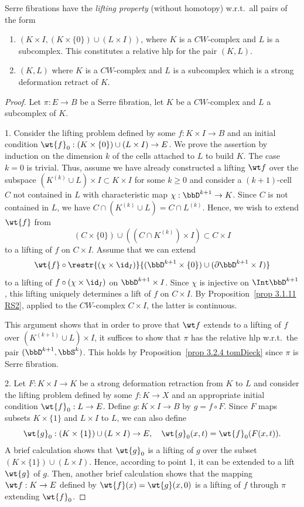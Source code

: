 \begin{prop}[{{\cite[Prop.~3.2.3]{RS2}}}]\label{prop 3.2.3 RS2}
    Serre fibrations have the \textit{lifting property} (without homotopy) w.r.t.\ all pairs of the form
    \begin{enumerate}
        \item $(K\times I,(K\times \{0\})\cup(L\times I))$, where $K$ is a $CW$-complex and $L$ is a subcomplex. This constitutes a relative \gls{hlp} for the pair $(K,L)$.
        \item $(K,L)$ where $K$ is a $CW$-complex and $L$ is a subcomplex which is a strong deformation retract of $K$.
    \end{enumerate}
\end{prop}
\begin{proof}
    Let $\pi:E\to B$ be a Serre fibration, let $K$ be a $CW$-complex and $L$ a subcomplex of $K$.

    1. Consider the lifting problem defined by some $f:K\times I\to B$ and an initial condition $\wt{f}_0:(K\times\{0\})\cup(L\times I)\to E$. We prove the assertion by induction on the dimension $k$ of the cells attached to $L$ to build $K$. The case $k=0$ is trivial. Thus, assume we have already constructed a lifting $\wt f$ over the subspace $(K^{(k)}\cup L)\times I\subset K\times I$ for some $k\geq 0$ and consider a $(k+1)$-cell $C$ not contained in $L$ with characteristic map $\chi:\bbD^{k+1}\to K$. Since $C$ is not contained in $L$, we have $C\cap (K^{(k)}\cup L)=C\cap L^{(k)}$. Hence, we wish to extend $\wt{f}$ from 
    \[(C\times\{0\}) \cup((C\cap K^{(k)})\times I)\subset C\times I\]
    to a lifting of $f$ on $C\times I$. Assume that we can extend
    \[\wt{f}\circ \restr{(\chi\times\id_I)}{(\bbD^{k+1}\times\{0\})\cup (\partial \bbD^{k+1}\times I)}\]
    to a lifting of $f\circ (\chi\times\id_I)$ on $\bbD^{k+1}\times I$. Since $\chi $ is injective on $\Int \bbD^{k+1}$, this lifting uniquely determines a lift of $f$ on $C\times I$. By Proposition~\ref{prop 3.1.11 RS2}, applied to the $CW$-complex $C\times I$, the latter is continuous.

    This argument shows that in order to prove that $\wt f$ extends to a lifting of $f$ over $(K^{(k+1)}\cup L)\times I$, it suffices to show that $\pi$ has the relative \gls{hlp} w.r.t.\ the pair $(\bbD^{k+1},\bbS^k)$. This holds by Proposition~\ref{prop 3.2.4 tomDieck} since $\pi$ is Serre fibration.

    2. Let $F:K\times I\to K$ be a strong deformation retraction from $K$ to $L$ and consider the lifting problem defined by some $f:K\to X$ and an appropriate initial condition $\wt{f}_0:L\to E$. Define $g:K\times I\to B$ by $g=f\circ F$. Since $F$ maps subsets $K\times\{1\}$ and $L\times I$ to $L$, we can also define
    \[\wt{g}_0:(K\times\{1\})\cup(L\times I)\to E,\quad \wt{g}_0(x,t)=\wt{f}_0(F(x,t)).\]
    A brief calculation shows that $\wt{g}_0$ is a lifting of $g$ over the subset $(K\times\{1\})\cup(L\times I)$. Hence, according to point 1, it can be extended to a lift $\wt{g}$ of $g$. Then, another brief calculation shows that the mapping $\wt f:K\to E$ defined by $\wt{f}(x)=\wt{g}(x,0)$ is a lifting of $f$ through $\pi$ extending $\wt{f}_0$.
\end{proof}

